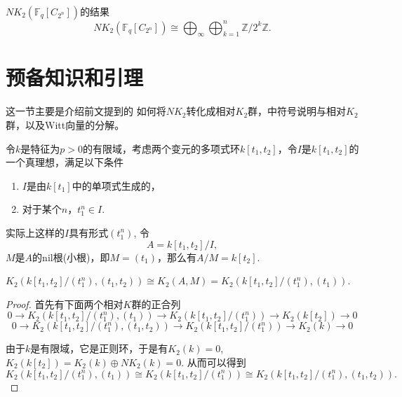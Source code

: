 $NK_2(\mathbb{F}_q[C_{2^n}])$的结果
{\color{red}\[NK_2(\mathbb{F}_q[C_{2^n}])\cong \bigoplus_\infty \bigoplus_{k=1}^n \mathbb{Z}/2^k\mathbb{Z}.\]}



























\section{预备知识和引理}
这一节主要是介绍前文提到的{\color{blue} 如何将$NK_2$转化成相对$K_2$群，\cite{MR86f:18017}中符号说明与相对$K_2$群，以及Witt向量的分解}。








令$k$是特征为$p>0$的有限域，考虑两个变元的多项式环$k[t_1,t_2]$，令$I$是$k[t_1,t_2]$的一个真理想，满足以下条件
\begin{enumerate}
	\item $I$是由$k[t_1]$中的单项式生成的，
	\item 对于某个$n$，$t_1^n\in I$. 
\end{enumerate}

实际上这样的$I$具有形式$(t_1^n)$,
令
\[A=k[t_1,t_2]/I,\]
$M$是$A$的nil根(小根)，即$M=(t_1)$，那么有$A/M=k[t_2]$.
\begin{prop}
	$K_2(k[t_1,t_2]/(t_1^n),(t_1,t_2))\cong K_2(A,M)=K_2(k[t_1,t_2]/(t_1^n),(t_1))$.
\end{prop}
\begin{proof}
	首先有下面两个相对$K$群的正合列
	\[
	0\longrightarrow K_2(k[t_1,t_2]/(t_1^n),(t_1)) \longrightarrow K_2(k[t_1,t_2]/(t_1^n)) \longrightarrow K_2(k[t_2]) \longrightarrow 0
	\]
	\[
	0\longrightarrow K_2(k[t_1,t_2]/(t_1^n),(t_1,t_2)) \longrightarrow K_2(k[t_1,t_2]/(t_1^n)) \longrightarrow K_2(k) \longrightarrow 0
	\]

	由于$k$是有限域，它是正则环，于是有$K_2(k)=0$, $K_2(k[t_2])=K_2(k)\oplus NK_2(k)=0$. 从而可以得到
	\[K_2(k[t_1,t_2]/(t_1^n),(t_1))\cong K_2(k[t_1,t_2]/(t_1^n)) \cong K_2(k[t_1,t_2]/(t_1^n),(t_1,t_2)).\]
\end{proof}

